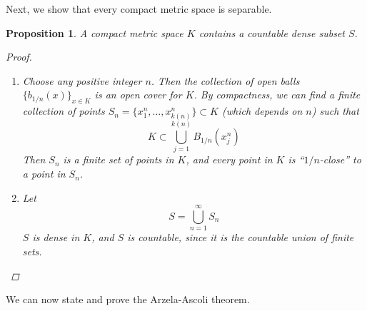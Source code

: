\documentclass[10pt]{article}         %
\newtheorem{proposition}{Proposition}[section]
\theoremstyle{remark}
\begin{document}
Next, we show that every compact metric space is separable.

\begin{proposition}
A compact metric space $K$ contains a countable dense subset $S$.
\begin{proof}
\begin{enumerate}
    \item Choose any positive integer $n$. Then the collection of open balls $\{ b_{1/n}(x)\}_{x \in K}$ is an open cover for $K$. By compactness, we can find a finite collection of points $S_n = \{x_1^n, \dots, x_{k(n)}^n\} \subset K$ (which depends on $n$) such that
    \[
    K \subset \bigcup_{j = 1}^{k(n)}B_{1/n}(x_j^n)
    \]
    Then $S_n$ is a finite set of points in $K$, and every point in $K$ is ``$1/n$-close'' to a point in $S_n$.
    \item Let
    \[
    S = \bigcup_{n=1}^\infty S_n
    \]
    $S$ is dense in $K$, and $S$ is countable, since it is the countable union of finite sets.
\end{enumerate}
\end{proof}
\end{proposition}

We can now state and prove the Arzela-Ascoli theorem.
\end{document}
